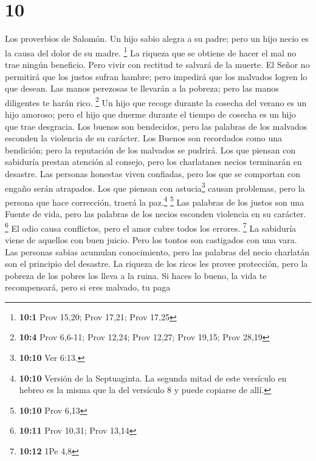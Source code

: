 \hypertarget{section-9}{%
\section{10}\label{section-9}}

 Los proverbios de Salomón. Un hijo sabio alegra a su
padre; pero un hijo necio es la causa del dolor de su madre. \footnote{\textbf{10:1}
  Prov 15,20; Prov 17,21; Prov 17,25}  La riqueza que se
obtiene de hacer el mal no trae ningún beneficio. Pero vivir con
rectitud te salvará de la muerte.  El Señor no permitirá
que los justos sufran hambre; pero impedirá que los malvados logren lo
que desean.  Las manos perezosas te llevarán a la pobreza;
pero las manos diligentes te harán rico. \footnote{\textbf{10:4} Prov
  6,6-11; Prov 12,24; Prov 12,27; Prov 19,15; Prov 28,19} 
Un hijo que recoge durante la cosecha del verano es un hijo amoroso;
pero el hijo que duerme durante el tiempo de cosecha es un hijo que trae
desgracia.  Los buenos son bendecidos, pero las palabras
de los malvados esconden la violencia de su carácter.  Los
Buenos son recordados como una bendición; pero la reputación de los
malvados se pudrirá.  Los que piensan con sabiduría
prestan atención al consejo, pero los charlatanes necios terminarán en
desastre.  Las personas honestas viven confiadas, pero los
que se comportan con engaño serán atrapados.  Los que
piensan con astucia\footnote{\textbf{10:10} Ver 6:13.} causan problemas,
pero la persona que hace corrección, traerá la paz.\footnote{\textbf{10:10}
  Versión de la Septuaginta. La segunda mitad de este versículo en
  hebreo es la misma que la del versículo 8 y puede copiarse de allí.}
\footnote{\textbf{10:10} Prov 6,13}  Las palabras de los
justos son una Fuente de vida, pero las palabras de los necios esconden
violencia en su carácter. \footnote{\textbf{10:11} Prov 10,31; Prov
  13,14}  El odio causa conflictos, pero el amor cubre
todos los errores. \footnote{\textbf{10:12} 1Pe 4,8}  La
sabiduría viene de aquellos con buen juicio. Pero los tontos son
castigados con una vara.  Las personas sabias acumulan
conocimiento, pero las palabras del necio charlatán son el principio del
desastre.  La riqueza de los ricos les provee protección,
pero la pobreza de los pobres los lleva a la ruina.  Si
haces lo bueno, la vida te recompensará, pero si eres malvado, tu paga
